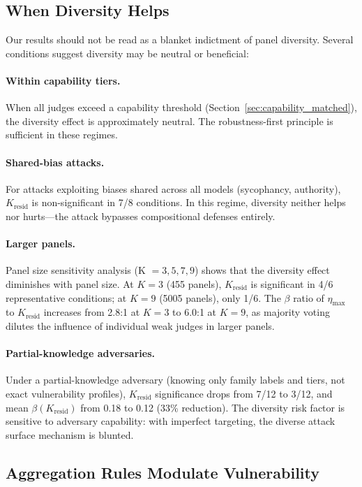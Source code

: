 \documentclass[11pt,a4paper]{article}
\newcommand{\etamax}{\eta_{\max}}
\newcommand{\kresid}{K_{\text{resid}}}
\begin{document}
\subsection{When Diversity Helps}
\label{sec:when_helps}

Our results should not be read as a blanket indictment of panel diversity. Several conditions suggest diversity may be neutral or beneficial:

\paragraph{Within capability tiers.} When all judges exceed a capability threshold (Section~\ref{sec:capability_matched}), the diversity effect is approximately neutral. The robustness-first principle is sufficient in these regimes.

\paragraph{Shared-bias attacks.} For attacks exploiting biases shared across all models (sycophancy, authority), $\kresid$ is non-significant in 7/8 conditions. In this regime, diversity neither helps nor hurts---the attack bypasses compositional defenses entirely.

\paragraph{Larger panels.} Panel size sensitivity analysis (K $= 3, 5, 7, 9$) shows that the diversity effect diminishes with panel size. At $K = 3$ (455 panels), $\kresid$ is significant in 4/6 representative conditions; at $K = 9$ (5005 panels), only 1/6. The $\beta$ ratio of $\etamax$ to $\kresid$ increases from 2.8:1 at $K = 3$ to 6.0:1 at $K = 9$, as majority voting dilutes the influence of individual weak judges in larger panels.

\paragraph{Partial-knowledge adversaries.} Under a partial-knowledge adversary (knowing only family labels and tiers, not exact vulnerability profiles), $\kresid$ significance drops from 7/12 to 3/12, and mean $\beta(\kresid)$ from 0.18 to 0.12 (33\% reduction). The diversity risk factor is sensitive to adversary capability: with imperfect targeting, the diverse attack surface mechanism is blunted.

\subsection{Aggregation Rules Modulate Vulnerability}
\end{document}
